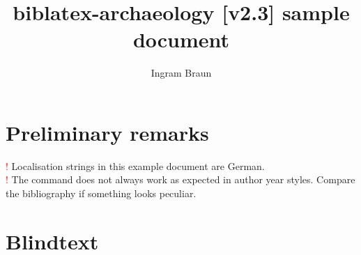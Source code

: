 \documentclass[a4paper,12pt]{scrartcl}
\title{biblatex-archaeology [v2.3] sample document}
\author{Ingram Braun}
\newcommand{\exmplwarn}[1]{\textcolor{red}{\Huge!} #1\\}
\begin{document}
\maketitle
\tableofcontents

\section{Preliminary remarks}

\exmplwarn{Localisation strings in this example document are German.}
    {\exmplwarn{The \detokenize{\fullcite} command does not always work as expected in author year styles. Compare the bibliography if something looks peculiar.}%
    }
    {}

\section{Blindtext}
\end{document}
